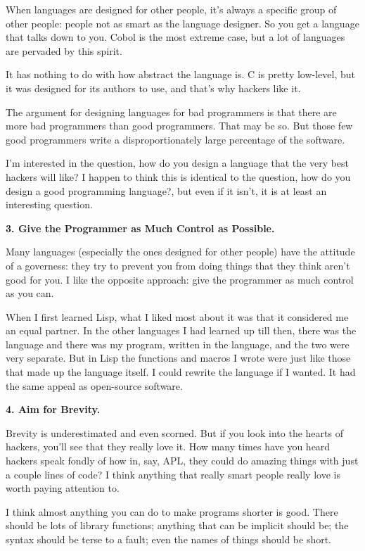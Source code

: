 When languages are designed for other people, it's always a specific
group of other people: people not as smart as the language designer. So
you get a language that talks down to you. Cobol is the most extreme
case, but a lot of languages are pervaded by this spirit.

It has nothing to do with how abstract the language is. C is pretty
low-level, but it was designed for its authors to use, and that's why
hackers like it.

The argument for designing languages for bad programmers is that there
are more bad programmers than good programmers. That may be so. But
those few good programmers write a disproportionately large percentage
of the software.

I'm interested in the question, how do you design a language that the
very best hackers will like? I happen to think this is identical to the
question, how do you design a good programming language?, but even if it
isn't, it is at least an interesting question.

\textbf{3. Give the Programmer as Much Control as Possible.}

Many languages (especially the ones designed for other people) have the
attitude of a governess: they try to prevent you from doing things that
they think aren't good for you. I like the opposite approach: give the
programmer as much control as you can.

When I first learned Lisp, what I liked most about it was that it
considered me an equal partner. In the other languages I had learned up
till then, there was the language and there was my program, written in
the language, and the two were very separate. But in Lisp the functions
and macros I wrote were just like those that made up the language
itself. I could rewrite the language if I wanted. It had the same appeal
as open-source software.

\textbf{4. Aim for Brevity.}

Brevity is underestimated and even scorned. But if you look into the
hearts of hackers, you'll see that they really love it. How many times
have you heard hackers speak fondly of how in, say, APL, they could do
amazing things with just a couple lines of code? I think anything that
really smart people really love is worth paying attention to.

I think almost anything you can do to make programs shorter is good.
There should be lots of library functions; anything that can be implicit
should be; the syntax should be terse to a fault; even the names of
things should be short.

